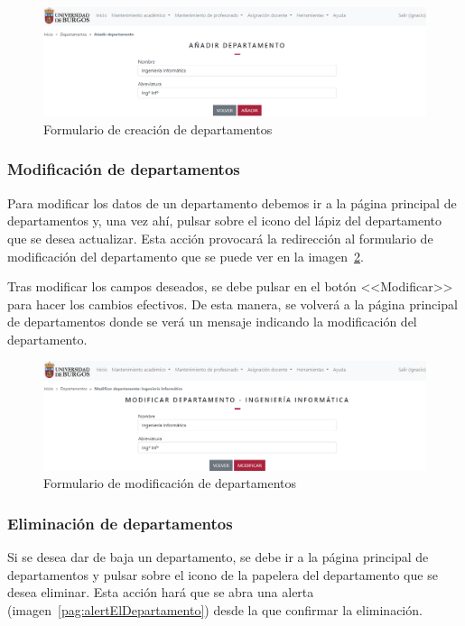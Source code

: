 \begin{figure}
	\centering
	\includegraphics[width=\textwidth]{../img/Anexos/Manual usuario/formDepartamento.png}
	\caption{Formulario de creación de departamentos}\label{pag:formDepartamento}
\end{figure}

\subsubsection{Modificación de departamentos}
Para modificar los datos de un departamento debemos ir a la página principal de departamentos y, una vez ahí, pulsar sobre el icono del lápiz del departamento que se desea actualizar.
Esta acción provocará la redirección al formulario de modificación del departamento que se puede ver en la imagen~\ref{pag:formModDepartamento}.

Tras modificar los campos deseados, se debe pulsar en el botón <<Modificar>> para hacer los cambios efectivos.
De esta manera, se volverá a la página principal de departamentos donde se verá un mensaje indicando la modificación del departamento.

\begin{figure}
	\centering
	\includegraphics[width=\textwidth]{../img/Anexos/Manual usuario/formModDepartamento.png}
	\caption{Formulario de modificación de departamentos}\label{pag:formModDepartamento}
\end{figure}

\subsubsection{Eliminación de departamentos}
Si se desea dar de baja un departamento, se debe ir a la página principal de departamentos y pulsar sobre el icono de la papelera del departamento que se desea eliminar.
Esta acción hará que se abra una alerta (imagen~\ref{pag:alertElDepartamento}) desde la que confirmar la eliminación.

